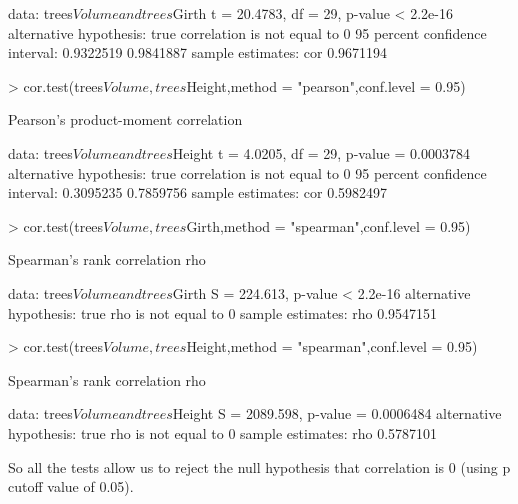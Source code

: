 \documentclass[a4paper]{article}
\begin{document}
\begin{itemize}
\begin{Schunk}
\begin{Soutput}
data:  trees$Volume and trees$Girth
t = 20.4783, df = 29, p-value < 2.2e-16
alternative hypothesis: true correlation is not equal to 0
95 percent confidence interval:
 0.9322519 0.9841887
sample estimates:
      cor 
0.9671194 
\end{Soutput}
\begin{Sinput}
> cor.test(trees$Volume,trees$Height,method = "pearson",conf.level = 0.95)
\end{Sinput}
\begin{Soutput}
	Pearson's product-moment correlation

data:  trees$Volume and trees$Height
t = 4.0205, df = 29, p-value = 0.0003784
alternative hypothesis: true correlation is not equal to 0
95 percent confidence interval:
 0.3095235 0.7859756
sample estimates:
      cor 
0.5982497 
\end{Soutput}
\begin{Sinput}
> cor.test(trees$Volume,trees$Girth,method = "spearman",conf.level = 0.95)
\end{Sinput}
\begin{Soutput}
	Spearman's rank correlation rho

data:  trees$Volume and trees$Girth
S = 224.613, p-value < 2.2e-16
alternative hypothesis: true rho is not equal to 0
sample estimates:
      rho 
0.9547151 
\end{Soutput}
\begin{Sinput}
> cor.test(trees$Volume,trees$Height,method = "spearman",conf.level = 0.95)
\end{Sinput}
\begin{Soutput}
	Spearman's rank correlation rho

data:  trees$Volume and trees$Height
S = 2089.598, p-value = 0.0006484
alternative hypothesis: true rho is not equal to 0
sample estimates:
      rho 
0.5787101 
\end{Soutput}
\end{Schunk}
So all the tests allow us to reject the null hypothesis that correlation is 0 (using p cutoff value of 0.05).

\end{itemize}
\end{document}
